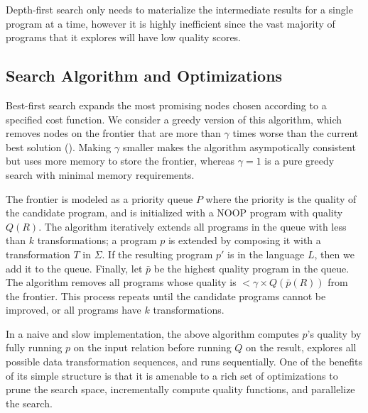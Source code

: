 
 Depth-first search only needs to materialize the intermediate results for a single program at a time, however it is highly inefficient since the vast majority of programs that it explores will have low quality scores.  


\subsection{Search Algorithm and Optimizations}
Best-first search expands the most promising nodes chosen according to a specified cost function.
We consider a greedy version of this algorithm, which removes nodes on the frontier that are more than $\gamma$ times worse than the current best solution ().
Making $\gamma$ smaller makes the algorithm asympotically consistent but uses more memory to store the frontier, whereas $\gamma=1$ is a pure greedy search with minimal memory requirements.  

The frontier is modeled as a priority queue $P$ where the priority is the quality of the candidate program, and is initialized with a NOOP program with quality $Q(R)$.  
The algorithm iteratively extends all programs in the queue with less than $k$ transformations; a program $p$ is extended by composing it with a transformation $T$ in $\Sigma$.  If the resulting program $p'$ is in the language $L$, then we add it to the queue.
Finally, let $\bar{p}$ be the highest quality program in the queue.  The algorithm removes all programs whose quality is $<\gamma\times Q(\bar{p}(R))$ from the frontier.  
This process repeats until the candidate programs cannot be improved, or all programs have $k$ transformations.

In a naive and slow implementation, the above algorithm computes $p$'s quality by fully running $p$ on the input relation before running $Q$ on the result, explores all possible data transformation sequences, and runs sequentially.  One of the benefits of its simple structure is that it is amenable to a rich set of optimizations to prune the search space, incrementally compute quality functions, and parallelize the search.  

